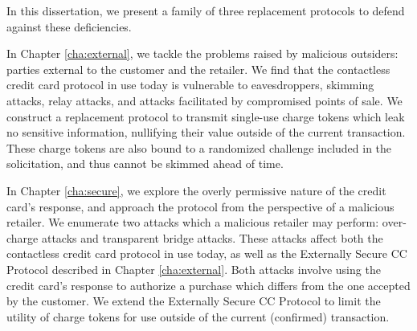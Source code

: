 In this dissertation, we present a family of three replacement protocols to defend against these deficiencies.

In Chapter \ref{cha:external}, we tackle the problems raised by malicious outsiders: parties external to the customer and the retailer.
We find that the contactless credit card protocol in use today is vulnerable to eavesdroppers, skimming attacks, relay attacks, and attacks facilitated by compromised points of sale.
We construct a replacement protocol to transmit single-use charge tokens which leak no sensitive information, nullifying their value outside of the current transaction.
These charge tokens are also bound to a randomized challenge included in the solicitation, and thus cannot be skimmed ahead of time.

In Chapter \ref{cha:secure}, we explore the overly permissive nature of the credit card's response, and approach the protocol from the perspective of a malicious retailer.
We enumerate two attacks which a malicious retailer may perform: over-charge attacks and transparent bridge attacks.
These attacks affect both the contactless credit card protocol in use today, as well as the Externally Secure CC Protocol described in Chapter \ref{cha:external}.
Both attacks involve using the credit card's response to authorize a purchase which differs from the one accepted by the customer.
We extend the Externally Secure CC Protocol to limit the utility of charge tokens for use outside of the current (confirmed) transaction.